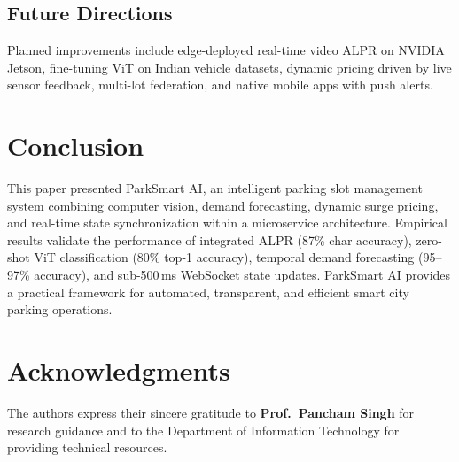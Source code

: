 \documentclass[conference,10pt]{IEEEtran}
\begin{document}
\subsection{Future Directions}
Planned improvements include edge-deployed real-time video ALPR on NVIDIA Jetson, fine-tuning ViT on Indian vehicle datasets, dynamic pricing driven by live sensor feedback, multi-lot federation, and native mobile apps with push alerts.

\section{Conclusion}

This paper presented ParkSmart AI, an intelligent parking slot management system combining computer vision, demand forecasting, dynamic surge pricing, and real-time state synchronization within a microservice architecture. Empirical results validate the performance of integrated ALPR (87\% char accuracy), zero-shot ViT classification (80\% top-1 accuracy), temporal demand forecasting (95--97\% accuracy), and sub-500\,ms WebSocket state updates. ParkSmart AI provides a practical framework for automated, transparent, and efficient smart city parking operations.

\section*{Acknowledgments}
The authors express their sincere gratitude to \textbf{Prof.\ Pancham Singh} for research guidance and to the Department of Information Technology for providing technical resources.

\end{document}
